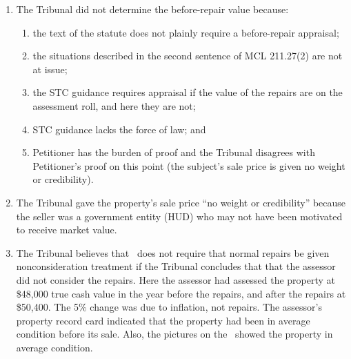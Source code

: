 \documentclass[12pt,\documentclassflag]{michiganCourtOfAppealsBrief}
\begin{document}
\begin{enumerate}
  
\item The Tribunal did not determine the before-repair value because:
  \begin{enumerate}
  \item the text of the statute does not plainly require a before-repair appraisal;
  \item the situations described in the second sentence of MCL 211.27(2) are not at issue;
  \item the STC guidance requires appraisal if the value of the repairs are on the assessment roll, and here they are not;
  \item STC guidance lacks the force of law; and
  \item Petitioner has the burden of proof and the Tribunal disagrees with Petitioner's proof on this point (the subject's sale price is given no weight or credibility).
  \end{enumerate}
  
\item The Tribunal gave the property's sale price ``no weight or credibility'' because the seller was a government entity (HUD) who may not have been motivated to receive market value.
  
\item The Tribunal believes that \mathieuGast\ does not require that normal repairs be given nonconsideration treatment if the Tribunal concludes that that the assessor did not consider the repairs. Here the assessor had assessed the property at \$48,000 true cash value in the year before the repairs, and after the repairs at \$50,400. The 5\% change was due to inflation, not repairs. The assessor's property record card indicated that the property had been in average condition before its sale. Also, the pictures on the \MLS\ showed the property in average condition.

\end{enumerate}

\end{document}
